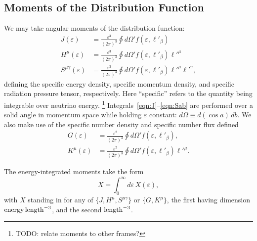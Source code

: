 \documentclass[aps,floatfix,prd,superscriptaddress,twocolumn]{revtex4-1}
\begin{document}

\subsection{Moments of the Distribution Function}
\label{ssec:moments}
We may take angular moments of the distribution function:
\begin{align}
  \label{eqn:J}
  J(\varepsilon) &=
  \frac{\varepsilon^3}{(2\pi)^3} \oint d\Omega' f(\varepsilon, \ell'_\beta) \\
  \label{eqn:Ha}
  H^\mu(\varepsilon) &=
  \frac{\varepsilon^3}{(2\pi)^3} \oint d\Omega' f(\varepsilon, \ell'_\beta) \ell'^\mu \\
  \label{eqn:Sab}
  S^{\mu\gamma}(\varepsilon) &=
  \frac{\varepsilon^3}{(2\pi)^3} \oint d\Omega' f(\varepsilon, \ell'_\beta) \ell'^\mu \ell'^\gamma,
\end{align}
defining the specific energy density,
specific momentum density, and
specific radiation pressure tensor, respectively.
Here ``specific'' refers to the quantity being integrable over neutrino energy.
\footnote{TODO: relate moments to other frames?}
Integrals~\ref{eqn:J}--\ref{eqn:Sab} are performed over a solid angle in
momentum space while holding $\varepsilon$ constant:
$d\Omega \equiv d(\cos a)\,db$.
We also make use of the specific number density and specific number flux defined
\begin{align}
  \label{eqn:G}
  G(\varepsilon) &=
  \frac{\varepsilon^2}{(2\pi)^3} \oint d\Omega' f(\varepsilon, \ell'_\beta), \\
  \label{eqn:Ka}
  K^\mu(\varepsilon) &=
  \frac{\varepsilon^2}{(2\pi)^3} \oint d\Omega' f(\varepsilon, \ell'_\beta) \ell'^\mu.
\end{align}

The energy-integrated moments take the form
\begin{equation}
  \label{eqn:J_H_S_eps_integrated}
  X = \int_0^\infty d\varepsilon \, X(\varepsilon),
\end{equation}
with $X$ standing in for any of $\{J,H^\mu,S^{\mu\gamma}\}$ or
$\{G,K^\mu\}$,
the first having dimension ${\rm energy}\,{\rm length}^{-3}$,
and the second ${\rm length}^{-3}$.
\end{document}
